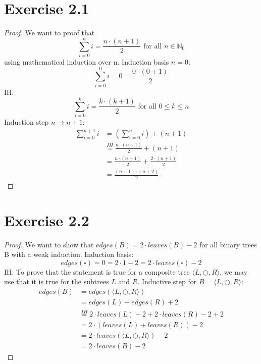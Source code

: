 \documentclass{article} %
\newcommand{\homeworkNumber}{2}
\begin{document}
\section*{Exercise \homeworkNumber.1}

\begin{proof}
We want to proof that \[\sum_{i=0}^{n} i = \frac{n \cdot (n+1)}{2} \text{ for all } n \in \mathbb{N}_0 \] using mathematical induction over n.\newline
\newline
Induction basis $n = 0$: 
\[ \sum_{i=0}^{0} i = 0 = \frac{0 \cdot(0+1)}{2} \]
IH: \[ \sum_{i=0}^{k} i = \frac{k \cdot (k+1)}{2} \text{ for all } 0 \leq k \leq n\]
Induction step $n \rightarrow n+1$:
\begin{align*}
\sum_{i=0}^{n+1} i & = \left( \sum_{i=0}^{n} i \right) + (n+1) \\
& \stackrel{IH}{=} \frac{n \cdot (n+1)}{2} + (n+1) \\
& = \frac{n \cdot (n+1)}{2} + \frac{2\cdot (n+1)}{2} \\
& = \frac{(n+1) \cdot (n+2)}{2}
\end{align*}
\end{proof}

\section*{Exercise \homeworkNumber.2}

\begin{proof}
We want to show that $edges(B) = 2 \cdot leaves(B) -2$ for all binary trees B with a weak induction.\newline
Induction basis: \[ edges(\square) = 0 = 2 \cdot 1 - 2 = 2 \cdot leaves(\square) - 2 \]
IH: To prove that the statement is true for a composite tree $\langle L, \bigcirc ,R  \rangle$, we may use that it is true for the subtrees $L$ and $R$.\newline
Inductive step for $B = \langle L, \bigcirc ,R \rangle$:
\begin{align*}
edges(B) & = edges(\langle L, \bigcirc ,R \rangle) \\
& = edges(L) + edges(R) + 2 \\
& \stackrel{IH}{=} 2 \cdot leaves(L) - 2 + 2 \cdot leaves(R) - 2 + 2 \\
& = 2 \cdot (leaves(L) + leaves(R)) - 2 \\
& = 2 \cdot leaves(\langle L, \bigcirc ,R \rangle) - 2 \\
& = 2 \cdot leaves(B) - 2
\end{align*}
\end{proof}
\end{document}
